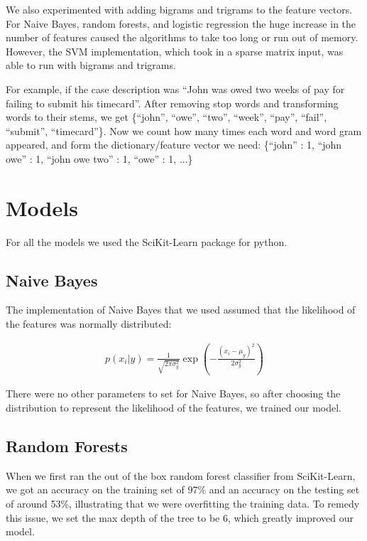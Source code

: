 \documentclass[journal]{IEEEtran}
\begin{document}
We also experimented with adding bigrams and trigrams to the feature vectors. For Naive Bayes, random forests, and logistic regression the huge increase in the number of features caused the algorithms to take too long or run out of memory. However, the SVM implementation, which took in a sparse matrix input, was able to run with bigrams and trigrams.

For example, if the case description was ``John was owed two weeks of pay for failing to submit his timecard''. After removing stop words and transforming words to their stems, we get \{``john'', ``owe'', ``two'', ``week'', ``pay'', ``fail'', ``submit'', ``timecard''\}. Now we count how many times each word and word gram appeared, and form the dictionary/feature vector we need: \{``john'' : 1, ``john owe'' : 1, ``john owe two'' : 1, ``owe'' : 1, ...\}

\section{Models}

For all the models we used the SciKit-Learn package \cite{scikit-learn} for python.

\subsection{Naive Bayes}

The implementation of Naive Bayes that we used assumed that the likelihood of the features was normally distributed:

\begin{equation}
\begin{aligned}
p(x_i | y) = \frac{1}{\sqrt{2 \pi \sigma_y^2}} \exp \left ( - \frac{(x_i - \mu_y)^2}{2\sigma_y^2}\right)
\end{aligned}
\end{equation}

There were no other parameters to set for Naive Bayes, so after choosing the distribution to represent the likelihood of the features, we trained our model.

\subsection{Random Forests}

When we first ran the out of the box random forest classifier from SciKit-Learn, we got an accuracy on the training set of 97\% and an accuracy on the testing set of around 53\%, illustrating that we were overfitting the training data. To remedy this issue, we set the max depth of the tree to be 6, which greatly improved our model. 
\end{document}
